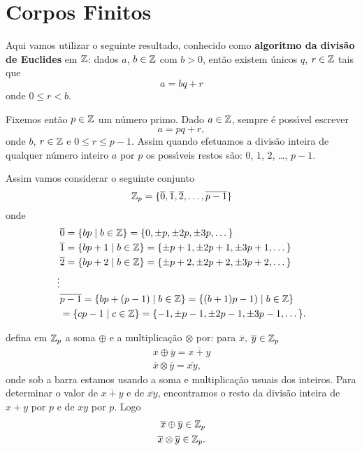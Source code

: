 
\section{Corpos Finitos}\label{sec:corpor_finitos}

Aqui vamos utilizar o seguinte resultado, conhecido como \textbf{algoritmo da divis\~ao de Euclides} em $\mathbb{Z}$: dados $a$, $b \in \mathbb{Z}$ com $b > 0$, ent\~ao existem \'unicos $q$, $r \in \mathbb{Z}$ tais que
\[
	a = bq + r
\]
onde $0 \le r < b$.


Fixemos ent\~ao $p \in \mathbb{Z}$ um n\'umero primo. Dado $a \in \mathbb{Z}$, sempre \'e poss{\'\i}vel escrever
\[
	a = pq + r,
\]
onde $b$, $r \in \mathbb{Z}$ e $0 \le r \le p - 1$. Assim quando efetuamos a divis\~ao inteira de qualquer n\'umero inteiro $a$ por $p$ os poss{\'\i}veis restos s\~ao: $0$, 
$1$, $2$, \dots, $p -1 $.

Assim vamos considerar o seguinte conjunto
\[
	\mathbb{Z}_p = \{\overline{0}, \overline{1}, \overline{2}, \dots, \overline{p - 1}\}
\]
onde
\begin{align*}
	&\overline{0} = \{bp \mid b \in \mathbb{Z}\} = \{0, \pm p, \pm 2p, \pm 3p, \dots\}\\
	&\overline{1} = \{bp + 1\mid b \in \mathbb{Z}\} = \{\pm p + 1, \pm 2p + 1, \pm 3p + 1, \dots\}\\
	&\overline{2} = \{bp + 2\mid b \in \mathbb{Z}\} = \{\pm p + 2, \pm 2p + 2, \pm 3p + 2, \dots\}\\
	\vdots\\
	&\overline{p - 1} = \{bp + (p - 1) \mid b \in \mathbb{Z}\} = \{(b + 1)p - 1) \mid b \in \mathbb{Z}\}\\ &= \{cp - 1 \mid c \in \mathbb{Z}\} = \{-1, \pm p - 1, \pm 2p - 1, \pm 3p - 1, \dots\}.
\end{align*}

defina em $\mathbb{Z}_p$ a soma $\oplus$ e a multiplica\c{c}\~ao $\otimes$ por: para $\overline{x}$, $\overline{y} \in \mathbb{Z}_p$
\begin{align*}
	\overline{x} \oplus \overline{y} = \overline{x + y}\\
	\overline{x} \otimes \overline{y} = \overline{xy},
\end{align*}
onde sob a barra estamos usando a soma e multiplica\c{c}\~ao usuais dos inteiros. Para determinar o valor de $\overline{x + y}$ e de $\overline{xy}$, encontramos o resto da divis\~ao inteira de $x + y$ por $p$ e de $xy$ por $p$. Logo
\begin{align*}
	\overline{x} \oplus \overline{y} \in \mathbb{Z}_p\\
	\overline{x} \otimes \overline{y} \in \mathbb{Z}_p.
\end{align*}

